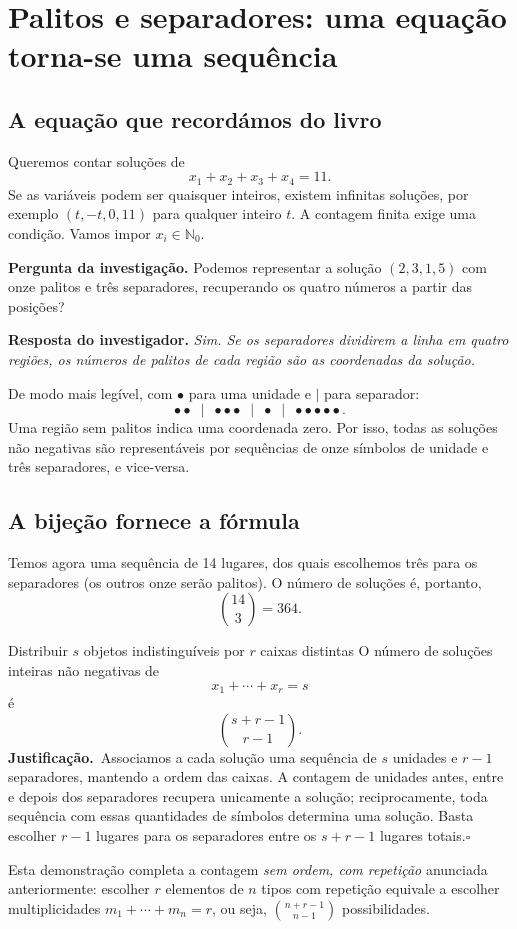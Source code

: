 \documentclass[11pt,a4paper,oneside]{book}
\newcommand{\Pergunta}[1]{\begin{perguntabox}\textbf{Pergunta da investigação.} #1\end{perguntabox}}
\newcommand{\Resposta}[1]{\textcolor{verdeescuro}{\textbf{Resposta do investigador.}} \emph{#1}\par}
\newcommand{\prova}{\textbf{Justificação.}\ }
\newcommand{\fimprova}{\hfill$\square$}
\newcommand{\Nzero}{\mathbb{N}_0}
\begin{document}
\chapter{Palitos e separadores: uma equação torna-se uma sequência}
\section{A equação que recordámos do livro}
Queremos contar soluções de
\[x_1+x_2+x_3+x_4=11.\]
Se as variáveis podem ser quaisquer inteiros, existem infinitas soluções, por exemplo $(t,-t,0,11)$ para qualquer inteiro $t$. A contagem finita exige uma condição. Vamos impor $x_i\in\Nzero$.
\Pergunta{Podemos representar a solução $(2,3,1,5)$ com onze palitos e três separadores, recuperando os quatro números a partir das posições?}
\Resposta{Sim. Se os separadores dividirem a linha em quatro regiões, os números de palitos de cada região são as coordenadas da solução.}
\begin{center}
\end{center}
De modo mais legível, com $\bullet$ para uma unidade e $\mid$ para separador:
\[\bullet\bullet\;\mid\;\bullet\bullet\bullet\;\mid\;\bullet\;\mid\;\bullet\bullet\bullet\bullet\bullet.\]
Uma região sem palitos indica uma coordenada zero. Por isso, todas as soluções não negativas são representáveis por sequências de onze símbolos de unidade e três separadores, e vice-versa.
\section{A bijeção fornece a fórmula}
Temos agora uma sequência de 14 lugares, dos quais escolhemos três para os separadores (os outros onze serão palitos). O número de soluções é, portanto,
\[\boxed{\binom{14}{3}=364}.\]
\begin{teoremabox}{Distribuir $s$ objetos indistinguíveis por $r$ caixas distintas}
O número de soluções inteiras não negativas de
\[x_1+\cdots+x_r=s\]
é
\[\boxed{\binom{s+r-1}{r-1}}.\]
\prova Associamos a cada solução uma sequência de $s$ unidades e $r-1$ separadores, mantendo a ordem das caixas. A contagem de unidades antes, entre e depois dos separadores recupera unicamente a solução; reciprocamente, toda sequência com essas quantidades de símbolos determina uma solução. Basta escolher $r-1$ lugares para os separadores entre os $s+r-1$ lugares totais.\fimprova
\end{teoremabox}
Esta demonstração completa a contagem \emph{sem ordem, com repetição} anunciada anteriormente: escolher $r$ elementos de $n$ tipos com repetição equivale a escolher multiplicidades $m_1+\cdots+m_n=r$, ou seja, $\binom{n+r-1}{n-1}$ possibilidades.
\end{document}
